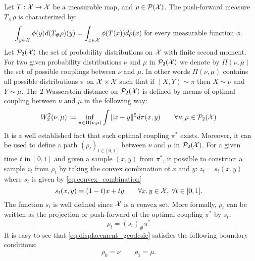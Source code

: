Let $T: {{\mathcal X}} \rightarrow {{\mathcal X}}$ be a measurable map, and $\rho \in \mathcal{P}({{\mathcal X}})$. The push-forward measure $T_{\#}\rho$
is characterized by:
\begin{align}
 \int_{y \in {{\mathcal X}}} \phi(y) d(T_{\#}\rho)(y) =\int_{x \in {{\mathcal X}}}\phi(T(x)) d\rho(x) \text{ for every measurable function $\phi$.}
\end{align}
Let $\mathcal{P}_2({{\mathcal X}})$ the set of probability distributions on ${{\mathcal X}}$ with finite second moment. For two given probability distributions $\nu$ and $\mu$ in $\mathcal{P}_2({{\mathcal X}})$ we denote by $\Pi(\nu,\mu)$ the set of possible couplings between $\nu$ and $\mu$. In other words $\Pi(\nu,\mu)$ contains all possible distributions $\pi$ on ${{\mathcal X}}\times {{\mathcal X}}$ such that if $(X,Y) \sim \pi $ then $X \sim \nu $ and $Y\sim \mu$. The $2$-Wasserstein distance on $\mathcal{P}_2({{\mathcal X}})$ is defined by means of optimal coupling between $\nu$ and $\mu$ in the following way:
\begin{align}\label{eq:wasserstein_2}
W_2^2(\nu,\mu) := \inf_{\pi\in\Pi(\nu,\mu)} \int \Vert x - y\Vert^2 d\pi(x,y) \qquad \forall \nu, \mu\in \mathcal{P}_2({{\mathcal X}})
\end{align}
It is a well established fact that such optimal coupling $\pi^*$ exists. Moreover, it can be used to define a path $(\rho_t)_{t\in [0,1]}$ between $\nu$ and $\mu$ in $\mathcal{P}_2({{\mathcal X}})$. For a given time $t$ in $[0,1]$ and given a sample $(x,y)$ from $\pi^{*}$, it possible to construct a sample $z_t$ from $\rho_t$ by taking the convex combination of $x$ and $y$: $z_t = s_t(x,y)$ where $s_t$ is given by \cref{eq:convex_combination}
\begin{equation}\label{eq:convex_combination}
s_t(x,y) = (1-t)x+ty \qquad \forall x,y\in {{\mathcal X}}, \; \forall t\in [0,1].
\end{equation}
The function $s_t$ is well defined since ${{\mathcal X}}$ is a convex set. More formally, $\rho_t$ can be written as the projection or push-forward of the optimal coupling $\pi^{*}$ by $s_t$:  
\begin{equation}\label{eq:displacement_geodesic}
\rho_t = (s_t)_{\#}\pi^{*}
\end{equation}
It is easy to see that \cref{eq:displacement_geodesic} satisfies the following boundary conditions:
\begin{align}\label{eq:boundary_conditions}
\rho_0 = \nu \qquad \rho_1 = \mu.
\end{align}
